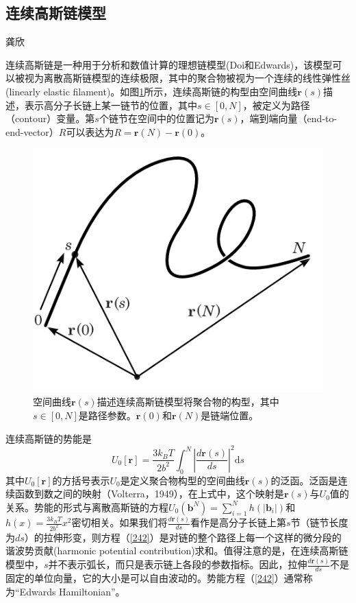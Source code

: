 \subsection{连续高斯链模型}
\begin{center}
龚欣
\end{center}

连续高斯链是一种用于分析和数值计算的理想链模型(Doi和Edwards)，该模型可以被视为离散高斯链模型的连续极限，其中的聚合物被视为一个连续的线性弹性丝(linearly elastic filament)。如图\ref{空间曲线描述聚合物构型}所示，连续高斯链的构型由空间曲线$\mathbf{r}(s)$描述，表示高分子长链上某一链节的位置，其中$s\in [0,N]$，被定义为路径（contour）变量。第$s$个链节在空间中的位置记为$\mathbf{r}(s)$，端到端向量（end-to-end-vector）$R$可以表达为$R=\mathbf{r}(N)−\mathbf{r}(0)$。
\begin{figure}[H]
\centering
\includegraphics[scale=0.5]{./figures/41.png}
\caption{空间曲线$\mathbf{r}(s)$描述连续高斯链模型将聚合物的构型，其中$s\in [0,N]$是路径参数。$\mathbf{r}(0)$和$\mathbf{r}(N)$是链端位置。}
\label{空间曲线描述聚合物构型}
\end{figure}

连续高斯链的势能是
\begin{equation}
U_0[\mathbf{r}]=\frac{3k_BT}{2b^2}\int_{0}^{N} \left| \frac{d\mathbf{r}(s)}{ds} \right|^2\mathrm{d}s \label{242}
\end{equation}
其中$U_0[\mathbf{r}]$的方括号表示$U_0$是定义聚合物构型的空间曲线$\mathbf{r}(s)$的泛函。泛函是连续函数到数之间的映射（Volterra，1949），在上式中，这个映射是$\mathbf{r}(s)$与$U_0$值的关系。势能的形式与离散高斯链的方程$U_0(\mathbf b^N)=\sum_{i=1}^{N}h(\left|\mathbf{b}_i\right|)$和$h(x)=\frac{3k_BT}{2b^2}x^2$密切相关。如果我们将$\frac{d\mathbf{r}(s)}{ds}$看作是高分子长链上第$s$节（链节长度为$ds$）的拉伸形变，则方程（\ref{242}）是对链的整个路径上每一个这样的微分段的谐波势贡献(harmonic potential contribution)求和。值得注意的是，在连续高斯链模型中，$s$并不表示弧长，而只是表示链上各段的参数指标。因此，拉伸$\frac{d\mathbf{r}(s)}{ds}$不是固定的单位向量，它的大小是可以自由波动的。势能方程（\ref{242}）通常称为“Edwards Hamiltonian”。

